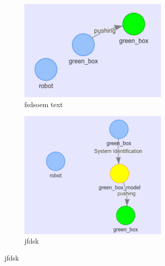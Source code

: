 \begin{figure}[H]
    \begin{subfigure}{.49\textwidth}
    \centering
    \includegraphics[width=0.8\textwidth]{figures/example_hyp_graph/2}
    \caption{fsdsoem text }%
    \end{subfigure}
    \hfill
    \begin{subfigure}{.49\textwidth}
    \centering
    \includegraphics[width=0.8\textwidth]{figures/example_hyp_graph/3}
    \caption{jfdsk}%
    \end{subfigure}


\end{figure}
